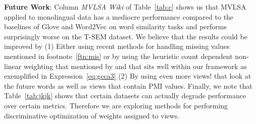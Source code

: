 \documentclass[11pt]{article}
\newcommand{\remove}[1]{}
\begin{document}
\noindent\textbf{Future Work}: Column \emph{MVLSA Wiki} of
Table~\ref{tab:c} shows us that MVLSA applied to monolingual data has
a mediocre performance  compared to the baselines of Glove and
Word2Vec on word similarity tasks and performs surprisingly worse on
the T-SEM dataset. We believe that the results could be improved by (1)
Either using recent methods for handling missing values
mentioned in footnote~\ref{ftn:mis} or by using the heuristic count dependent
non-linear weighting that mentioned by 
and that sits well within our framework as exemplified in Expression~\ref{eq:gcca3}
 (2) By using even more views! that
look at the future words as well as views that contain PMI values. 
Finally, we note that Table~\ref{tab:jkjk} shows that certain datasets can
actually degrade performance over certain metrics. Therefore we are
exploring methods for performing discriminative optimization of weights
assigned to views.

\remove{
\section*{Acknowledgments}
This material is based on research sponsored by Defense Advanced Research
Projects Agency (DARPA) under the Deep Exploration and
Filtering of Text (DEFT) Program (Agreement number
FA8750-13-2-0017). We also thank Juri Ganitkevitch for 
providing the word aligned bitext corpus.
}


\end{document}
